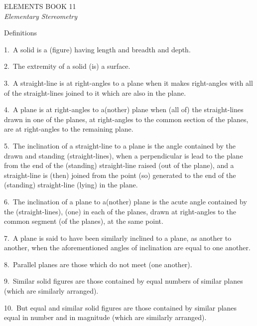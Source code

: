 \pagestyle{plain}
\begin{center}
{\Huge ELEMENTS BOOK 11}\\
\spa\spa\spa
{\huge\it Elementary Stereometry}
\end{center}\newpage

\pagestyle{fancy}
\cfoot{\gr{\thepage}}

\begin{center}
{\large Definitions}
\end{center}

1.~A solid is a (figure) having length and breadth and depth.

2.~The extremity of a solid (is) a surface.

3.~A straight-line is at right-angles to a plane when it makes right-angles with all of the
straight-lines joined to it which are also in the plane.

4.~A plane is at right-angles to a(nother) plane when (all of) the  straight-lines drawn in one of the planes, at right-angles to the common section
of the planes, are at right-angles to the remaining plane.

5.~The inclination of a straight-line to a plane is the angle contained
by the drawn and standing (straight-lines), when a perpendicular is
lead  to the plane from the end of the (standing) straight-line raised (out of the plane), and a straight-line
is (then) joined from the point (so) generated to the end of the (standing) straight-line (lying) in the plane.

6.~The inclination of a plane to a(nother) plane is the  acute angle
contained by the (straight-lines), (one)  in each of the planes, drawn at right-angles to the common segment
(of the planes), at the same point.

7.~A plane is said to have been similarly inclined to a plane,
as another  to  another, when the aforementioned angles
of inclination are equal to one another.

8.~Parallel planes are those which do not meet (one another).

9.~Similar solid figures are those contained by equal numbers of similar
planes (which are similarly arranged).

10.~But equal and similar solid figures are those contained
by similar planes equal in number and in magnitude (which are similarly arranged).

